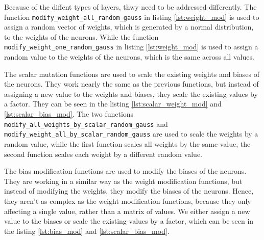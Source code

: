 Because of the diffent types of layers, thwy need to be addressed differently.
The function \texttt{modify\_weight\_all\_random\_gauss} in listing \ref{lst:weight_mod} is used to assign a random vector of weights, which is generated by a normal distribution, to the weights of the neurons.
While the function \texttt{modify\_weight\_one\_random\_gauss} in listing \ref{lst:weight_mod} is used to assign a random value to the weights of the neurons, which is the same across all values.

The scalar mutation functions are used to scale the existing weights and biases of the neurons.
They work nearly the same as the previous functions, but instead of assigning a new value to the weights and biases, they scale the existing values by a factor.
They can be seen in the listing \ref{lst:scalar_weight_mod} and \ref{lst:scalar_bias_mod}.
The two functions \texttt{modify\_all\_weights\_by\_scalar\_random\_gauss} and \texttt{modify\_weight\_all\_by\_scalar\_random\_gauss} are used to scale the weights by a random value, while the first function scales all weights by the same value, the second function scales each weight by a different random value.

The bias modification functions are used to modify the biases of the neurons.
They are working in a similar way as the weight modification functions, but instead of modifying the weights, they modify the biases of the neurons.
Hence, they aren't as complex as the weight modification functions, because they only affecting a single value, rather than a matrix of values.
We either assign a new value to the biases or scale the existing values by a factor, which can be seen in the listing \ref{lst:bias_mod} and \ref{lst:scalar_bias_mod}.

